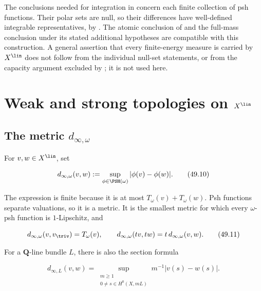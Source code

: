 \begin{remark}
\label{rem:ch49-consistency-ch46}
The conclusions needed for integration in  concern
each finite collection of psh functions.  Their polar sets are null,
so their differences have well-defined integrable representatives,
by .
The atomic conclusion of  and the full-mass
conclusion under its stated additional hypotheses are compatible with
this construction.  A general assertion that every finite-energy measure
is carried by $X^{\lin}$ does not follow from the individual null-set
statements, or from the capacity argument excluded by
; it is not used here.
\end{remark}

\section{Weak and strong topologies on
\texorpdfstring{$X^{\lin}$}{the linear-growth locus}}
\label{sec:ch49-topologies}

\subsection{The metric \texorpdfstring{$d_{\infty,\omega}$}{d infinity}}
\label{sec:ch49-dinfty}

\begin{definition}
\label{def:bj-dinfty}
For $v,w\in X^{\lin}$, set

\[
 d_{\infty,\omega}(v,w):=
 \sup_{\phi\in\PSH(\omega)}|\phi(v)-\phi(w)|.
\tag{49.10}\label{eq:bj-dinfty}
\]
\end{definition}

The expression is finite because it is at most
$T_\omega(v)+T_\omega(w)$.  Psh functions separate valuations, so it is
a metric.  It is the smallest metric for which every $\omega$-psh
function is $1$-Lipschitz, and

\[
 d_{\infty,\omega}(v,v_{\triv})=T_\omega(v),\qquad
 d_{\infty,\omega}(tv,tw)=t\,d_{\infty,\omega}(v,w).
\tag{49.11}\label{eq:bj-dinfty-homogeneity}
\]

For a $\mathbf Q$-line bundle $L$, there is also the section formula

\[
 d_{\infty,L}(v,w)
 =\sup_{\substack{m\geq1\\0\ne s\in H^0(X,mL)}}
      m^{-1}|v(s)-w(s)|.
\tag{49.12}\label{eq:bj-dinfty-sections}
\]

